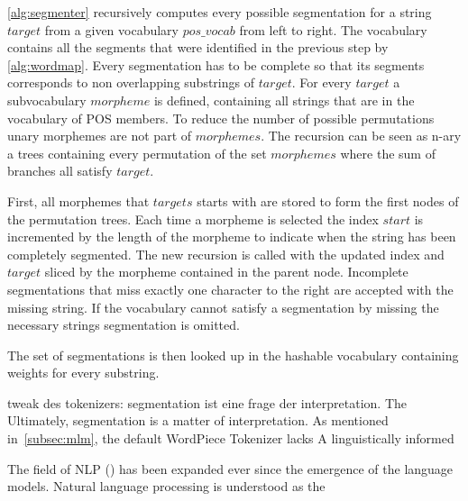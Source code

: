 \autoref{alg:segmenter} recursively computes every possible segmentation for a string $target$ from a given vocabulary $pos\_vocab$ from left to right.
The vocabulary contains all the segments that were identified in the previous step by \autoref{alg:wordmap}.
Every segmentation has to be complete so that its segments corresponds to non overlapping substrings of $target$.
For every $target$ a subvocabulary $morpheme$ is defined, containing all strings that are in the vocabulary of \ac{POS} \- members.
To reduce the number of possible permutations unary morphemes are not part of $morphemes$.
The recursion can be seen as n-ary a trees containing every permutation of the set $morphemes$ where the sum of branches all satisfy $target$.

First, all morphemes that $targets$ starts with are stored to form the first nodes of the permutation trees.
Each time a morpheme is selected the index $start$ is incremented by the length of the morpheme to indicate when the string has been completely segmented.
The new recursion is called with the updated index and $target$ sliced by the morpheme contained in the parent node.
Incomplete segmentations that miss exactly one character to the right are accepted with the missing string.
If the vocabulary cannot satisfy a segmentation by missing the necessary strings segmentation is omitted.

The set of segmentations is then looked up in the hashable vocabulary containing weights for every substring.


tweak des tokenizers: segmentation ist eine frage der interpretation.
The
Ultimately, segmentation is a matter of interpretation.
As mentioned in~\ref{subsec:mlm}, the default WordPiece Tokenizer lacks
A linguistically informed



The field of NLP  (\cite{METZLER2016}) has been expanded ever since the emergence of the language models.
Natural language processing is understood as the